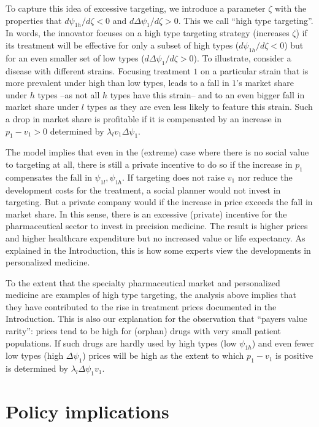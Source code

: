 \documentclass[a4paper,12pt]{article}
\begin{document}
To capture this idea of excessive targeting, we introduce a parameter \(\zeta\) with the properties that \(d\psi_{1h}/d\zeta <0\) and \(d\Delta \psi_1/d\zeta>0\). This we call ``high type targeting''. In words, the innovator focuses on a high type targeting strategy (increases \(\zeta\)) if its treatment will be effective for only a subset of high types (\(d\psi_{1h}/d\zeta <0\)) but for an even smaller set of low types (\(d\Delta\psi_1/d\zeta>0\)). To illustrate, consider a disease with different strains. Focusing treatment \(1\) on a particular strain that is more prevalent under high than low types, leads to a fall in \(1\)'s market share under \(h\) types --as not all \(h\) types have this strain-- and to an even bigger fall in market share under \(l\) types as they are even less likely to feature this strain. Such a drop in market share is profitable if it is compensated by an increase in \(p_1-v_1>0\) determined by \(\lambda_l v_1 \Delta \psi_1\).

The model implies that even in the (extreme) case where there is no social value to targeting at all, there is still a private incentive to do so if the increase in \(p_1\) compensates the fall in \(\psi_{1l},\psi_{1h}\). If targeting does not raise \(v_1\) nor reduce the development costs for the treatment, a social planner would not invest in targeting. But a private company would if the increase in price exceeds the fall in market share. In this sense, there is an excessive (private) incentive for the pharmaceutical sector to invest in precision medicine. The result is higher prices and higher healthcare expenditure but no increased value or life expectancy. As explained in the Introduction, this is how some experts view the developments in personalized medicine.

To the extent that the specialty pharmaceutical market and  personalized medicine are examples of high type targeting, the analysis above implies that they have contributed to the rise in treatment prices documented in the Introduction. This is also our explanation for the observation that ``payers value rarity'': prices tend to be high for (orphan) drugs with very small patient populations. If such drugs are hardly used by high types (low \(\psi_{1h}\)) and even fewer low types (high \(\Delta \psi_1\)) prices will be high as the extent to which \(p_1-v_1\) is positive is determined by \(\lambda_l \Delta \psi_1 v_1\).


\section{Policy implications}
\label{sec:orgeba2816}
\end{document}
